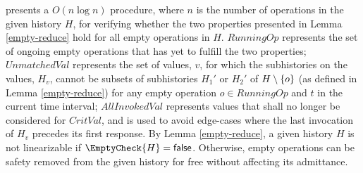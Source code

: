 

 presents a $O(n \log n)$ procedure, where $n$ is the number of operations in the given history $H$, for verifying whether the two properties presented in Lemma \ref{empty-reduce} hold for all empty operations in $H$. $RunningOp$ represents the set of ongoing empty operations that has yet to fulfill the two properties; $UnmatchedVal$ represents the set of values, $v$, for which the subhistories on the values, $H_v$, cannot be subsets of subhistories $H_1'$ or $H_2'$ of $H\setminus \{o\}$ (as defined in Lemma \ref{empty-reduce}) for any empty operation $o\in RunningOp$ and $t$ in the current time interval; $AllInvokedVal$ represents values that shall no longer be considered for $CritVal$, and is used to avoid edge-cases where the last invocation of $H_v$ precedes its first response. By Lemma \ref{empty-reduce}, a given history $H$ is not linearizable if $\EmptyCheck{H} = \false$. Otherwise, empty operations can be safety removed from the given history for free without affecting its admittance.